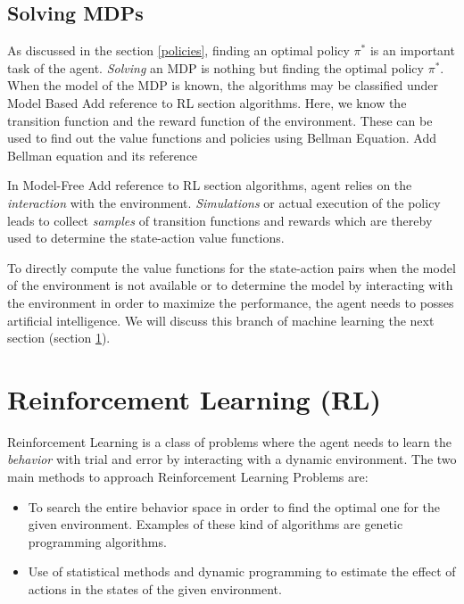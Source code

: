 \documentclass[12pt]{report}
\begin{document}
\subsection{Solving MDPs}
\label{bellman}
As discussed in the section \ref{policies}, finding an optimal policy $\pi^*$ is an important task of the agent. \textit{Solving} an MDP is nothing but finding the optimal policy $\pi^*$. When the model of the MDP is known, the algorithms may be classified under Model Based {\color{red} Add reference to RL section} algorithms. Here, we know the transition function and the reward function of the environment. These can be used to find out the value functions and policies using Bellman Equation. {\color{red} Add Bellman equation and its reference}\par 
In Model-Free {\color{red} Add reference to RL section} algorithms, agent relies on the \textit{interaction} with the environment. \textit{Simulations} or actual execution of the policy leads to collect \textit{samples} of transition functions and rewards which are thereby used to determine the state-action value functions.\par 
To directly compute the value functions for the state-action pairs when the model of the environment is not available or to determine the model by interacting with the environment in order to maximize the performance, the agent needs to posses artificial intelligence. We will discuss this branch of machine learning the next section (section \ref{rl}).

\section{Reinforcement Learning (RL)}
\label{rl}
Reinforcement Learning is a class of problems where the agent needs to learn the \textit{behavior} with trial and error by interacting with a dynamic environment. The two main methods to approach Reinforcement Learning Problems are:
\begin{itemize}
\item To search the entire behavior space in order to find the optimal one for the given environment. Examples of these kind of algorithms are genetic programming algorithms.
\item Use of statistical methods and dynamic programming to estimate the effect of actions in the states of the given environment. \cite{kaelbling1996reinforcement}
\end{itemize}
\end{document}

